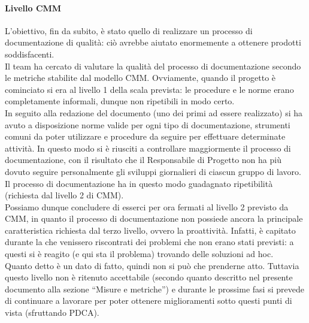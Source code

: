 			\paragraph{Livello CMM}
				L'obiettivo, fin da subito, è stato quello di realizzare un processo di documentazione di qualità: ciò avrebbe aiutato enormemente a 
				ottenere prodotti soddisfacenti.\\
				Il team ha cercato di valutare la qualità del processo di documentazione secondo le metriche stabilite dal modello CMM. Ovviamente, quando 
				il progetto è cominciato si era al livello 1 della scala prevista: le procedure e le norme erano completamente informali, dunque non 
				ripetibili in modo certo.\\
				In seguito alla redazione del documento  (uno dei primi ad essere realizzato) si ha avuto a disposizione norme 
				valide per ogni tipo di documentazione, strumenti comuni da poter utilizzare e procedure da seguire per effettuare determinate attività. 
				In questo modo si è riusciti a controllare maggiormente il processo di documentazione, con il risultato che il Responsabile di Progetto 
				non ha più dovuto seguire personalmente gli sviluppi giornalieri di ciascun gruppo di lavoro. Il processo di documentazione ha in questo 
				modo guadagnato ripetibilità (richiesta dal livello 2 di CMM).\\
				Possiamo dunque concludere di esserci per ora fermati al livello 2 previsto da CMM, in quanto il processo di documentazione non possiede 
				ancora la principale caratteristica richiesta dal terzo livello, ovvero la proattività. Infatti, è capitato durante la  che 
				venissero riscontrati dei problemi che non erano stati previsti: a questi si è reagito (e qui sta il problema) trovando delle soluzioni 
				ad hoc.\\
				Quanto detto è un dato di fatto, quindi non si può che prenderne atto. Tuttavia questo livello non è ritenuto accettabile (secondo quanto 
				descritto nel presente documento alla sezione “Misure e metriche”) e durante le prossime fasi si prevede di continuare a lavorare per 
				poter ottenere miglioramenti sotto questi punti di vista (sfruttando PDCA).
